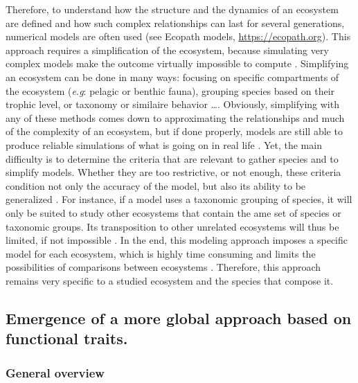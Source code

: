 Therefore, to understand how the structure and the dynamics of an ecosystem are defined and how such complex relationships can last for several generations, numerical models are often used (see Ecopath models, \url{https://ecopath.org}). This approach requires a simplification of the ecosystem, because simulating very complex models make the outcome virtually impossible to compute \citep{albouy2011}. Simplifying an ecosystem can be done in many ways: focusing on specific compartments of the ecosystem (\textit{e.g}: pelagic or benthic fauna), grouping species based on their trophic level, or taxonomy or similaire behavior \ldots{}. Obviously, simplifying with any of these methods comes down to approximating the relationships and much of the complexity of an ecosystem, but if done properly, models are still able to produce reliable simulations of what is going on in real life \citep{albouy2011,evans2012,piroddi2015}. Yet, the main difficulty is to determine the criteria that are relevant to gather species and to simplify models. Whether they are too restrictive, or not enough, these criteria condition not only the accuracy of the model, but also its ability to be generalized \citep{moon2017,pease2015,pont2006}. For instance, if a model uses a taxonomic grouping of species, it will only be suited to study other ecosystems that contain the ame set of species or taxonomic groups. Its transposition to other unrelated ecosystems will thus be limited, if not impossible \citep{moon2017}. In the end, this modeling approach imposes a specific model for each ecosystem, which is highly time consuming and limits the possibilities of comparisons between ecosystems \citep{martini2020, mcgill2006}. Therefore, this approach remains very specific to a studied ecosystem and the species that compose it. 


\subsection{Emergence of a more global approach based on functional traits.}

\subsubsection{General overview}

